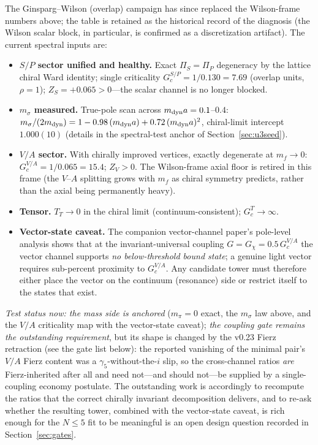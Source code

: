 \documentclass[11pt,a4paper]{article}
\begin{document}
The Ginsparg--Wilson (overlap) campaign has since replaced the
Wilson-frame numbers above; the table is retained as the
historical record of the diagnosis (the Wilson scalar block, in
particular, is confirmed as a discretization artifact).  The
current spectral inputs are:
\begin{itemize}
\item \textbf{$S/P$ sector unified and healthy.}  Exact
$\Pi_S = \Pi_P$ degeneracy by the lattice chiral Ward identity;
single criticality $G_c^{S/P} = 1/0.130 = 7.69$ (overlap units,
$\rho = 1$); $Z_S = +0.065 > 0$---the scalar channel is no longer
blocked.
\item \textbf{$m_\sigma$ measured.}  True-pole scan across
$m_{\rm dyn} a = 0.1$--$0.4$:
$m_\sigma/(2m_{\rm dyn}) = 1 - 0.98\,(m_{\rm dyn}a)
+ 0.72\,(m_{\rm dyn}a)^2$, chiral-limit intercept $1.000(10)$
(details in the spectral-test anchor of
Section~\ref{sec:u3seed}).
\item \textbf{$V/A$ sector.}  With chirally improved vertices,
exactly degenerate at $m_f \to 0$: $G_c^{V/A} = 1/0.065 = 15.4$;
$Z_V > 0$.  The Wilson-frame axial floor is retired in this frame
(the $V$--$A$ splitting grows with $m_f$ as chiral symmetry
predicts, rather than the axial being permanently heavy).
\item \textbf{Tensor.}  $T_T \to 0$ in the chiral limit
(continuum-consistent); $G_c^T \to \infty$.
\item \textbf{Vector-state caveat.}  The companion vector-channel
paper's pole-level analysis shows that at the invariant-universal
coupling $G = G_\chi = 0.5\,G_c^{V/A}$ the vector channel supports
\emph{no below-threshold bound state}; a genuine light vector
requires sub-percent proximity to $G_c^{V/A}$.  Any candidate
tower must therefore either place the vector on the continuum
(resonance) side or restrict itself to the states that exist.
\end{itemize}
\emph{Test status now: the mass side is anchored}
($m_\pi = 0$ exact, the $m_\sigma$ law above, and the $V/A$
criticality map with the vector-state caveat); \emph{the coupling
gate remains the outstanding requirement}, but its shape is
changed by the v0.23 Fierz retraction (see the gate list below):
the reported vanishing of the minimal pair's $V/A$ Fierz content
was a $\gamma_5$-without-the-$i$ slip, so the cross-channel ratios
\emph{are} Fierz-inherited after all and need not---and should
not---be supplied by a single-coupling economy postulate.  The
outstanding work is accordingly to recompute the ratios that the
correct chirally invariant decomposition delivers, and to re-ask
whether the resulting tower, combined with the vector-state
caveat, is rich enough for the $N \le 5$
fit to be meaningful is an open design question recorded in
Section~\ref{sec:gates}.
\end{document}
